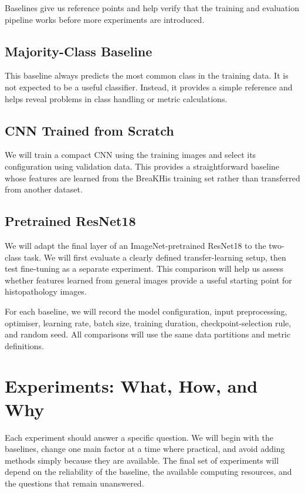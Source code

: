 \documentclass[11pt,a4paper]{article}
\begin{document}
Baselines give us reference points and help verify that the training and evaluation pipeline works before more experiments are introduced.

\subsection{Majority-Class Baseline}

This baseline always predicts the most common class in the training data. It is not expected to be a useful classifier. Instead, it provides a simple reference and helps reveal problems in class handling or metric calculations.

\subsection{CNN Trained from Scratch}

We will train a compact CNN using the training images and select its configuration using validation data. This provides a straightforward baseline whose features are learned from the BreaKHis training set rather than transferred from another dataset.

\subsection{Pretrained ResNet18}

We will adapt the final layer of an ImageNet-pretrained ResNet18 to the two-class task. We will first evaluate a clearly defined transfer-learning setup, then test fine-tuning as a separate experiment. This comparison will help us assess whether features learned from general images provide a useful starting point for histopathology images.

For each baseline, we will record the model configuration, input preprocessing, optimiser, learning rate, batch size, training duration, checkpoint-selection rule, and random seed. All comparisons will use the same data partitions and metric definitions.

\section{Experiments: What, How, and Why}

Each experiment should answer a specific question. We will begin with the baselines, change one main factor at a time where practical, and avoid adding methods simply because they are available. The final set of experiments will depend on the reliability of the baseline, the available computing resources, and the questions that remain unanswered.
\end{document}
